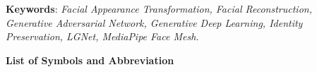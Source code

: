 \vspace{1em}
\noindent
\textbf{Keywords}: \textit{Facial Appearance Transformation, Facial Reconstruction, Generative Adversarial Network, Generative Deep Learning, Identity Preservation, LGNet, MediaPipe Face Mesh.}


\newpage

\tableofcontents
\newpage

\listoftables
\newpage

\listoffigures
\newpage
{}
\begin{center}
    {\Large\bfseries List of Symbols and Abbreviation}
\end{center}
\vspace{0.5em}
